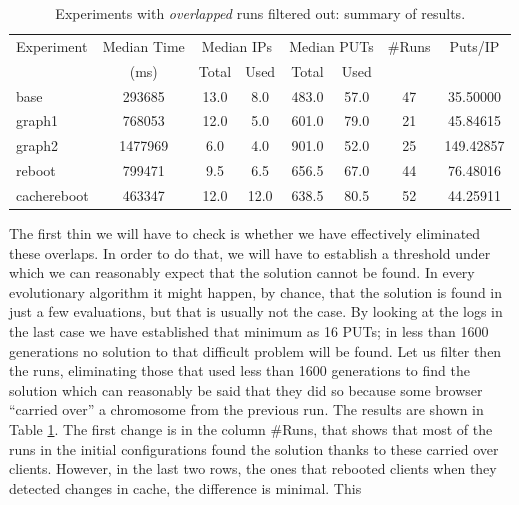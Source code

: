 \documentclass[runningheads,a4paper]{llncs}\usepackage[]{graphicx}\usepackage[]{color}
\begin{document}
%
\begin{table}
  \caption{Experiments with {\em overlapped} runs filtered out: summary of results. \label{tab:filtered}}
\begin{center}
\begin{tabular}{|l|c|c|c|c|c|c|c|}
\hline
Experiment & Median Time & \multicolumn{2}{|c|}{Median IPs} &\multicolumn{2}{|c|}{Median PUTs} & \#Runs &  Puts/IP \\
&   (ms)        & Total & Used & Total & Used &  & \\
\hline
base & 293685 & 13.0 & 8.0 & 483.0 & 57.0 & 47 & 35.50000\\
\hline
graph1 & 768053 & 12.0 & 5.0 & 601.0 & 79.0 & 21 & 45.84615\\
graph2 & 1477969 & 6.0 & 4.0 & 901.0 & 52.0 & 25 & 149.42857\\
\hline
reboot & 799471 & 9.5 & 6.5 & 656.5 & 67.0 & 44 & 76.48016\\
\hline
cachereboot & 463347 & 12.0 & 12.0 & 638.5 & 80.5 & 52 & 44.25911\\
\hline
\end{tabular}
%
\end{center}
\end{table}
%
The first thin we will have to check is whether we have effectively eliminated these
overlaps. In order to do that, we will have to establish a threshold
under which we can reasonably expect that the solution cannot be found. In every
evolutionary algorithm it might happen, by chance, that the solution
is found in just a few evaluations, but that is usually not the
case. By looking at the logs in the last case we have established that
minimum as 16 PUTs; in less than 1600 generations no solution to that
difficult problem will be found. Let us filter then the runs,
eliminating those that used less than 1600 generations to find the
solution which can reasonably be said that they did so because some
browser ``carried over'' a chromosome from the previous run. The
results are shown in Table \ref{tab:filtered}. The first change is in
the column \#Runs, that shows that most of the runs in the initial
configurations found the solution thanks to these carried over
clients. However, in the last two rows, the ones that rebooted clients
when they detected changes in cache, the difference is minimal. This
\end{document}
